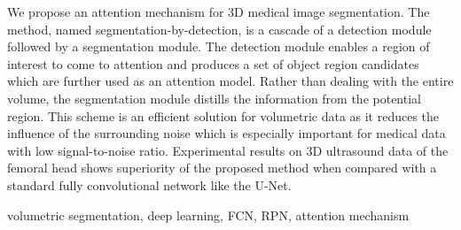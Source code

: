 We propose an attention mechanism for 3D medical image segmentation. The method, named segmentation-by-detection, is a cascade of a detection module followed by a segmentation module. The detection module enables a region of interest to come to attention and produces a set of object region candidates which are further used as an attention model.
Rather than dealing with the entire volume, the segmentation module distills the information from the potential region. This scheme is an efficient solution for volumetric data as it reduces the influence of the surrounding noise which is especially important for medical data with low signal-to-noise ratio. Experimental results on 3D ultrasound data of the femoral head shows superiority of the proposed method when compared with a standard fully convolutional network like the U-Net. 

\begin{keywords}
volumetric segmentation, deep learning, FCN, RPN, attention mechanism
\end{keywords}